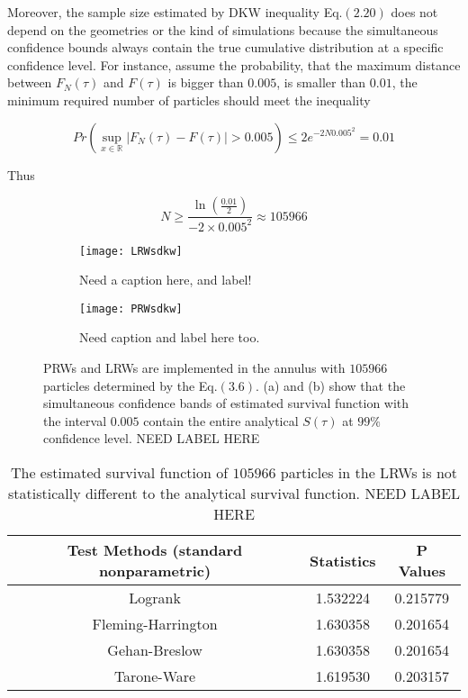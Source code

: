 Moreover, the sample size estimated by DKW inequality Eq.$(2.20)$ does
not depend on the geometries or the kind of simulations because the
simultaneous confidence bounds always contain the true cumulative
distribution at a specific confidence level. For instance, assume the
probability, that the maximum distance between $F_N(\tau)$ and
$F(\tau)$ is bigger than $0.005$, is smaller than $0.01$, the minimum
required number of particles should meet the inequality

\begin{equation}
  Pr(\sup_{x \in \mathbb{R}} |F_{N}(\tau) - F(\tau)| > 0.005) \leq 2e^{-2N0.005^2} = 0.01
\end{equation}

Thus

\begin{equation}
  N \geq \frac{\ln(\frac{0.01}{2})}{-2 \times 0.005^2} \approx
  105966
\end{equation}


\begin{figure}
  \begin{subfigure}{0.9\textwidth}
    \centering
    \texttt{[image: LRWsdkw]}
    \caption{Need a caption here, and label!}
  \end{subfigure}
  \begin{subfigure}{0.9\textwidth}
    \centering
    \texttt{[image: PRWsdkw]}
    \caption{Need caption and label here too.}
  \end{subfigure}
  \caption{PRWs and LRWs are implemented in the annulus with $105966$
    particles determined by the Eq.$(3.6)$. (a) and (b) show that the
    simultaneous confidence bands of estimated survival function with
    the interval $0.005$ contain the entire analytical $S(\tau)$ at
    $99 \%$ confidence level. NEED LABEL HERE}
\end{figure}

\begin{table}
  \centering
  \begin{tabular}{|c|c|c|}\hline
    Test Methods (standard nonparametric) & Statistics & P Values \\
    \hline
    Logrank & 1.532224 & 0.215779 \\
    \hline
    Fleming-Harrington & 1.630358 & 0.201654 \\
    \hline
    Gehan-Breslow & 1.630358 & 0.201654 \\
    \hline
    Tarone-Ware & 1.619530 & 0.203157 \\
    \hline
  \end{tabular}
  \caption{The estimated survival function of $105966$ particles in
    the LRWs is not statistically different to the analytical survival
    function. NEED LABEL HERE}
\end{table}


